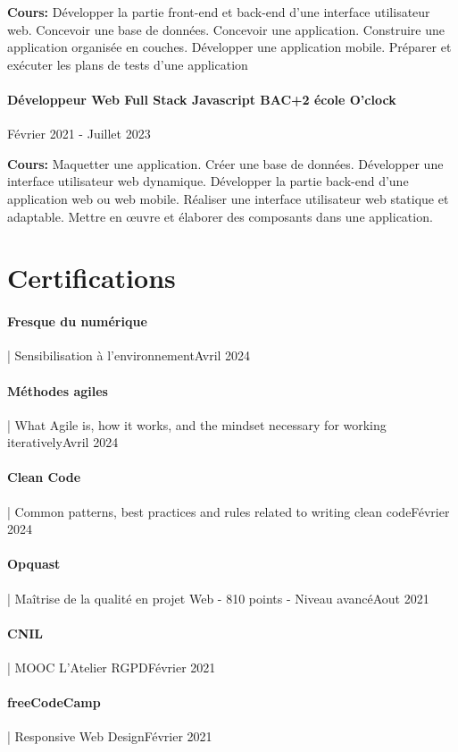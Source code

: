 \documentclass{article}
\begin{document}
\vspace{\baselineskip}
\textbf{Cours:} Développer la partie front-end et back-end d’une interface utilisateur web.
Concevoir une base de données.
Concevoir une application.
Construire une application organisée en couches.
Développer une application mobile.
Préparer et exécuter les plans de tests d’une application

\paragraph{Développeur Web Full Stack Javascript BAC+2 école O'clock}\hspace*{\fill}Février 2021 - Juillet 2023

\vspace{\baselineskip}
\textbf{Cours:} Maquetter une application.
Créer une base de données.
Développer une interface utilisateur web dynamique.
Développer la partie back-end d’une application web ou web mobile.
Réaliser une interface utilisateur web statique et adaptable.
Mettre en œuvre et élaborer des composants dans une application.

\vspace{2ex}
\hrulefill
\section*{Certifications}

\paragraph{Fresque du numérique} | Sensibilisation à l’environnement\hspace*{\fill}Avril 2024
\paragraph{Méthodes agiles} | What Agile is, how it works, and the mindset necessary for working iteratively\hspace*{\fill}Avril 2024
\paragraph{Clean Code} | Common patterns, best practices and rules related to writing clean code\hspace*{\fill}Février 2024
\paragraph{Opquast} | Maîtrise de la qualité en projet Web - 810 points - Niveau avancé\hspace*{\fill}Aout 2021
\paragraph{CNIL} | MOOC L'Atelier RGPD\hspace*{\fill}Février 2021
\paragraph{freeCodeCamp} | Responsive Web Design\hspace*{\fill}Février 2021
\end{document}
